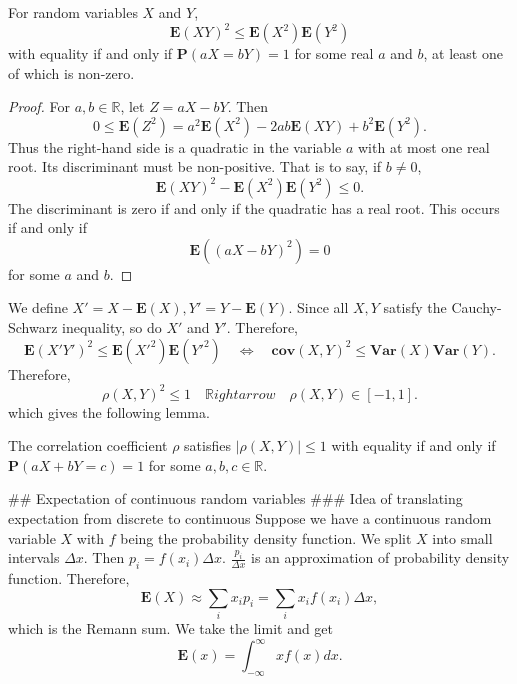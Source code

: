 \begin{theorem} For random variables $X$ and $Y$, 
\begin{equation*}
    \mathbf{E}(XY)^2 \leq \mathbf{E}(X^2) \mathbf{E}(Y^2)
\end{equation*} 
with equality if and only if $\mathbf{P}(aX = bY) = 1$ for some real $a$ and $b$, at least one of which is non-zero. 
\end{theorem}

\begin{proof}
For $a, b \in \mathbb{R}$, let $Z = aX - bY$. Then 
\begin{equation*}
    0 \leq \mathbf{E}(Z^2) = a^2 \mathbf{E}(X^2) - 2ab\mathbf{E}(XY) + b^2\mathbf{E}(Y^2).
\end{equation*}
Thus the right-hand side is a quadratic in the variable $a$ with at most one real root. Its discriminant must be non-positive. That is to say, if $b \neq 0$, 
\begin{equation*}
    \mathbf{E}(XY)^2 - \mathbf{E}(X^2) \mathbf{E}(Y^2) \leq 0. 
\end{equation*}
The discriminant is zero if and only if the quadratic has a real root. This occurs if and only if 
\begin{equation*}
    \mathbf{E}\left( (aX-bY)^2 \right) = 0
\end{equation*}
for some $a$ and $b$.
\end{proof}

We define $X' = X-\mathbf{E}(X), Y' = Y - \mathbf{E}(Y)$. Since all $X, Y$ satisfy the Cauchy-Schwarz inequality, so do $X'$ and $Y'$. Therefore, 
\begin{equation*}
    \mathbf{E}(X'Y')^2 \leq \mathbf{E}(X'^2) \mathbf{E}(Y'^2) \quad \Leftrightarrow \quad \mathbf{cov}(X, Y)^2 \leq \mathbf{Var}(X)\mathbf{Var}(Y).
\end{equation*}
Therefore, 
\begin{equation*}
    \rho(X,Y)^2 \leq 1 \quad \mathbb{R}ightarrow \quad \rho(X,Y) \in [-1, 1].
\end{equation*}
which gives the following lemma.

\begin{lemma}
The correlation coefficient $\rho$ satisfies $\left\vert \rho (X, Y)  \right\vert \leq 1$ with equality if and only if $\mathbf{P}(aX + bY = c) = 1$ for some $a, b, c \in \mathbb{R}$. 
\end{lemma}


## Expectation of continuous random variables
### Idea of translating expectation from discrete to continuous
Suppose we have a continuous random variable $X$ with $f$ being the probability density function. We split $X$ into small intervals $\Delta x$. Then $p_i = f(x_i)\Delta x$. $\frac{p_i}{\Delta x}$ is an approximation of probability density function. Therefore, 
\begin{equation*}
    \mathbf{E}(X) \approx \sum_{i} x_i p_i = \sum_{i} x_i f(x_i) \Delta x,
\end{equation*}
which is the Remann sum. We take the limit and get
\begin{equation*}
    \mathbf{E}(x) = \int_{-\infty}^\infty x f(x)dx.
\end{equation*}

